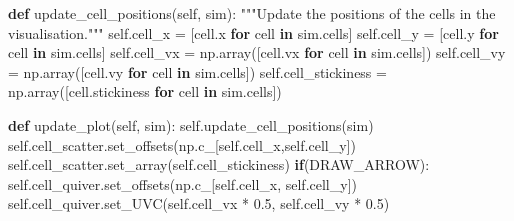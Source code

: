 \documentclass[
  letterpaper,
  DIV=11,
  numbers=noendperiod]{scrreprt}
\newenvironment{Shaded}{\begin{snugshade}}{\end{snugshade}}
\newcommand{\CommentTok}[1]{\textcolor[rgb]{0.37,0.37,0.37}{#1}}
\newcommand{\ControlFlowTok}[1]{\textcolor[rgb]{0.00,0.23,0.31}{\textbf{#1}}}
\newcommand{\FloatTok}[1]{\textcolor[rgb]{0.68,0.00,0.00}{#1}}
\newcommand{\KeywordTok}[1]{\textcolor[rgb]{0.00,0.23,0.31}{\textbf{#1}}}
\newcommand{\NormalTok}[1]{\textcolor[rgb]{0.00,0.23,0.31}{#1}}
\newcommand{\OperatorTok}[1]{\textcolor[rgb]{0.37,0.37,0.37}{#1}}
\newcommand{\VariableTok}[1]{\textcolor[rgb]{0.07,0.07,0.07}{#1}}
\theoremstyle{definition}
\theoremstyle{remark}
\begin{document}
\begin{tcolorbox}
\begin{Shaded}
\begin{Highlighting}[]
    \KeywordTok{def}\NormalTok{ update\_cell\_positions(}\VariableTok{self}\NormalTok{, sim):}
        \CommentTok{"""Update the positions of the cells in the visualisation."""}
        \VariableTok{self}\NormalTok{.cell\_x }\OperatorTok{=}\NormalTok{ [cell.x }\ControlFlowTok{for}\NormalTok{ cell }\KeywordTok{in}\NormalTok{ sim.cells]}
        \VariableTok{self}\NormalTok{.cell\_y }\OperatorTok{=}\NormalTok{ [cell.y }\ControlFlowTok{for}\NormalTok{ cell }\KeywordTok{in}\NormalTok{ sim.cells]}
        \VariableTok{self}\NormalTok{.cell\_vx }\OperatorTok{=}\NormalTok{ np.array([cell.vx }\ControlFlowTok{for}\NormalTok{ cell }\KeywordTok{in}\NormalTok{ sim.cells])}
        \VariableTok{self}\NormalTok{.cell\_vy }\OperatorTok{=}\NormalTok{ np.array([cell.vy }\ControlFlowTok{for}\NormalTok{ cell }\KeywordTok{in}\NormalTok{ sim.cells])}
        \VariableTok{self}\NormalTok{.cell\_stickiness }\OperatorTok{=}\NormalTok{ np.array([cell.stickiness }\ControlFlowTok{for}\NormalTok{ cell }\KeywordTok{in}\NormalTok{ sim.cells])}
    
    \KeywordTok{def}\NormalTok{ update\_plot(}\VariableTok{self}\NormalTok{, sim):}
        \VariableTok{self}\NormalTok{.update\_cell\_positions(sim)}
        \VariableTok{self}\NormalTok{.cell\_scatter.set\_offsets(np.c\_[}\VariableTok{self}\NormalTok{.cell\_x,}\VariableTok{self}\NormalTok{.cell\_y])}
        \VariableTok{self}\NormalTok{.cell\_scatter.set\_array(}\VariableTok{self}\NormalTok{.cell\_stickiness)}
        \ControlFlowTok{if}\NormalTok{(DRAW\_ARROW): }
            \VariableTok{self}\NormalTok{.cell\_quiver.set\_offsets(np.c\_[}\VariableTok{self}\NormalTok{.cell\_x, }\VariableTok{self}\NormalTok{.cell\_y])}
            \VariableTok{self}\NormalTok{.cell\_quiver.set\_UVC(}\VariableTok{self}\NormalTok{.cell\_vx }\OperatorTok{*} \FloatTok{0.5}\NormalTok{, }\VariableTok{self}\NormalTok{.cell\_vy }\OperatorTok{*} \FloatTok{0.5}\NormalTok{)        }


\end{Highlighting}
\end{Shaded}
\end{tcolorbox}
\end{document}
